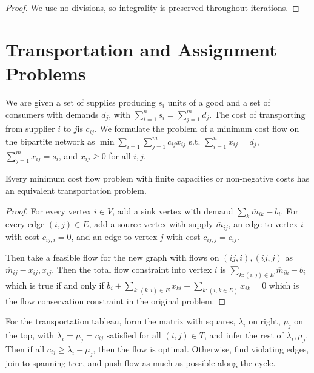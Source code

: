 \begin{proof}
  We use no divisions, so integrality is preserved throughout iterations.
\end{proof}

\section{Transportation and Assignment Problems}
\label{sec:transp-assignm-probl}

\begin{defn}
  \label{sec:transp-assignm-probl-1}
  We are given a set of supplies producing $s_{i}$ units of a good and
  a set of consumers with demands $d_{j}$, with $\sum_{i=1}^{n} s_{i}
  = \sum_{j=1}^{m} d_{j}$.  The cost of transporting  from supplier
  $i$ to $j$is $c_{ij}$.  We formulate the problem of a minimum cost
  flow on the bipartite network as $\min \sum_{i=1}^{} \sum_{j=1}^{m}
  c_{ij} x_{ij}$ s.t. $\sum_{i=1}^{n} x_{ij} = d_{j}$, $\sum_{j=1}^{m}
  x_{ij} = s_{i}$, and $x_{ij} \geq 0$ for all $i, j$.
\end{defn}

\begin{thm}
  \label{sec:transp-assignm-probl-2}
  Every minimum cost flow problem with finite capacities or
  non-negative costs has an equivalent transportation problem.
\end{thm}

\begin{proof}
  For every vertex $i \in V$, add a sink vertex with demand $\sum_{k}
  \overline m_{ik} - b_{i}$.  For every edge $(i, j) \in E$, add a
  source vertex with supply $\overline m_{ij}$, an edge to vertex $i$
  with cost $c_{ij, i} = 0$, and an edge to vertex $j$ with cost
  $c_{ij, j} = c_{ij}$.

  Then take a feasible flow for the new graph with flows on $(ij, i),
  (ij, j)$ as $\overline m_{ij} - x_{ij}, x_{ij}$.  Then the total
  flow constraint into vertex $i$ is $\sum_{k: (i, j) \in E}^{}
  \overline m_{ik} - b_{i}$ which is true if and only if $b_{i} +
  \sum_{k: (k, i) \in E}^{} x_{ki} - \sum_{k: (i, k \in E)}^{} x_{ik}
  = 0$ which is the flow conservation constraint in the original problem.
\end{proof}

\begin{thm}
  For the transportation tableau, form the matrix with squares, $\lambda_{i}$
  on right, $\mu_{j}$ on the top, with $\lambda_{i} = \mu_{j} =
  c_{ij}$ satisfied for all $(i, j) \in T$, and infer the rest of
  $\lambda_{i}, \mu_{j}$.  Then if all $c_{ij} \geq \lambda_{i} -
  \mu_{j}$, then the flow is optimal.  Otherwise, find violating
  edges, join to spanning tree, and push flow as much as possible
  along the cycle.
\end{thm}

